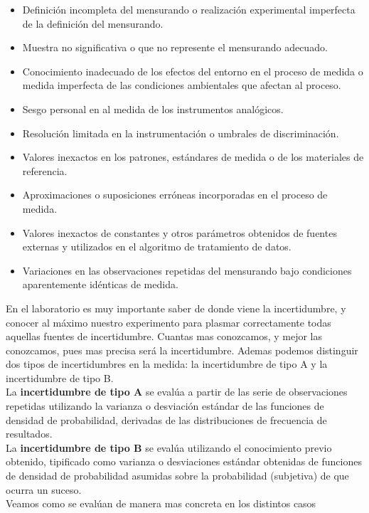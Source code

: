 \documentclass[12pt,a4paper]{book}
\begin{document}
\begin{itemize}
\item Definición incompleta del mensurando o realización experimental imperfecta de la definición del mensurando.
\item Muestra no significativa o que no represente el mensurando adecuado.
\item Conocimiento inadecuado de los efectos del entorno en el proceso de medida o medida imperfecta de las condiciones ambientales que afectan al proceso.
\item Sesgo personal en al medida de los instrumentos analógicos.
\item Resolución limitada en la instrumentación o umbrales de discriminación.
\item Valores inexactos en los patrones, estándares de medida o de los materiales de referencia.
\item Aproximaciones o suposiciones erróneas incorporadas en el proceso de medida.
\item Valores inexactos de constantes y otros parámetros obtenidos de fuentes externas y utilizados en el algoritmo de tratamiento de datos.
\item Variaciones en las observaciones repetidas del mensurando bajo condiciones aparentemente idénticas de medida.
\end{itemize}

En el laboratorio es muy importante saber de donde viene la incertidumbre, y conocer al máximo nuestro experimento para plasmar correctamente todas aquellas fuentes de incertidumbre. Cuantas mas conozcamos, y mejor las conozcamos, pues mas precisa será la incertidumbre. Ademas podemos distinguir dos tipos de incertidumbres en la medida: la incertidumbre de tipo A y la incertidumbre de tipo B. \\

La \textbf{incertidumbre de tipo A} se evalúa a partir de las serie de observaciones repetidas utilizando la varianza o desviación estándar de las funciones de densidad de probabilidad, derivadas de las distribuciones de frecuencia de resultados. \\

La \textbf{incertidumbre de tipo B} se evalúa utilizando el conocimiento previo obtenido, tipificado como varianza o desviaciones estándar obtenidas de funciones de densidad de probabilidad asumidas sobre la probabilidad (subjetiva) de que ocurra un suceso. \\

Veamos como se evalúan de manera mas concreta en los distintos casos
\end{document}
